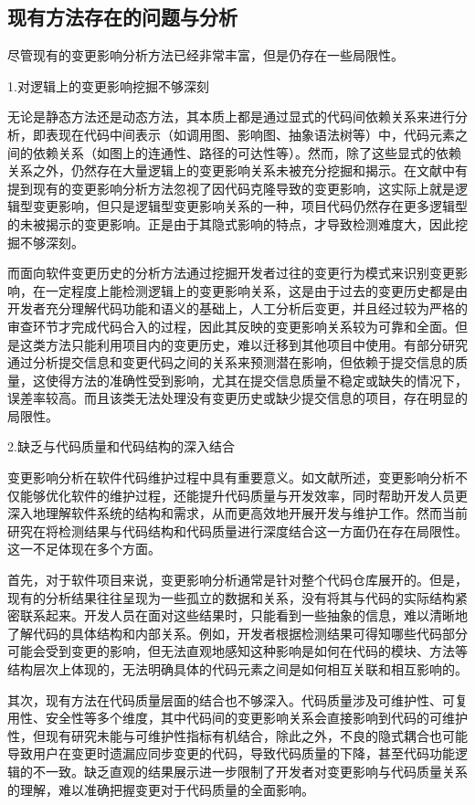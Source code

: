 \subsection{现有方法存在的问题与分析}

尽管现有的变更影响分析方法已经非常丰富，但是仍存在一些局限性。

1.对逻辑上的变更影响挖掘不够深刻

无论是静态方法还是动态方法，其本质上都是通过显式的代码间依赖关系来进行分析，即表现在代码中间表示（如调用图、影响图、抽象语法树等）中，代码元素之间的依赖关系（如图上的连通性、路径的可达性等）。然而，除了这些显式的依赖关系之外，仍然存在大量逻辑上的变更影响关系未被充分挖掘和揭示。在文献\cite{daipeng2024software}中有提到现有的变更影响分析方法忽视了因代码克隆导致的变更影响，这实际上就是逻辑型变更影响，但只是逻辑型变更影响关系的一种，项目代码仍然存在更多逻辑型的未被揭示的变更影响。正是由于其隐式影响的特点，才导致检测难度大，因此挖掘不够深刻。

而面向软件变更历史的分析方法通过挖掘开发者过往的变更行为模式来识别变更影响，在一定程度上能检测逻辑上的变更影响关系，这是由于过去的变更历史都是由开发者充分理解代码功能和语义的基础上，人工分析后变更，并且经过较为严格的审查环节才完成代码合入的过程，因此其反映的变更影响关系较为可靠和全面。但是这类方法只能利用项目内的变更历史，难以迁移到其他项目中使用。有部分研究通过分析提交信息和变更代码之间的关系来预测潜在影响，但依赖于提交信息的质量，这使得方法的准确性受到影响，尤其在提交信息质量不稳定或缺失的情况下，误差率较高。而且该类无法处理没有变更历史或缺少提交信息的项目，存在明显的局限性。


2.缺乏与代码质量和代码结构的深入结合

变更影响分析在软件代码维护过程中具有重要意义。如文献\cite{KRETSOU2021110892}所述，变更影响分析不仅能够优化软件的维护过程，还能提升代码质量与开发效率，同时帮助开发人员更深入地理解软件系统的结构和需求，从而更高效地开展开发与维护工作。然而当前研究在将检测结果与代码结构和代码质量进行深度结合这一方面仍在存在局限性。这一不足体现在多个方面。

首先，对于软件项目来说，变更影响分析通常是针对整个代码仓库展开的。但是，现有的分析结果往往呈现为一些孤立的数据和关系，没有将其与代码的实际结构紧密联系起来。开发人员在面对这些结果时，只能看到一些抽象的信息，难以清晰地了解代码的具体结构和内部关系。例如，开发者根据检测结果可得知哪些代码部分可能会受到变更的影响，但无法直观地感知这种影响是如何在代码的模块、方法等结构层次上体现的，无法明确具体的代码元素之间是如何相互关联和相互影响的。

其次，现有方法在代码质量层面的结合也不够深入。代码质量涉及可维护性、可复用性、安全性等多个维度，其中代码间的变更影响关系会直接影响到代码的可维护性，但现有研究未能与可维护性指标有机结合，除此之外，不良的隐式耦合也可能导致用户在变更时遗漏应同步变更的代码，导致代码质量的下降，甚至代码功能逻辑的不一致。缺乏直观的结果展示进一步限制了开发者对变更影响与代码质量关系的理解，难以准确把握变更对于代码质量的全面影响。


